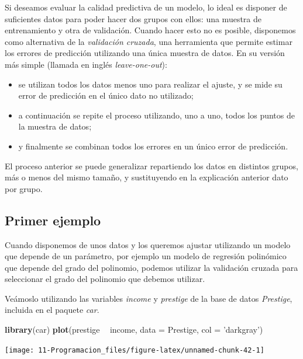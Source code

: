 \documentclass[]{book}
\newenvironment{Shaded}{\begin{snugshade}}{\end{snugshade}}
\newcommand{\KeywordTok}[1]{\textcolor[rgb]{0.13,0.29,0.53}{\textbf{#1}}}
\newcommand{\DataTypeTok}[1]{\textcolor[rgb]{0.13,0.29,0.53}{#1}}
\newcommand{\StringTok}[1]{\textcolor[rgb]{0.31,0.60,0.02}{#1}}
\newcommand{\OperatorTok}[1]{\textcolor[rgb]{0.81,0.36,0.00}{\textbf{#1}}}
\newcommand{\NormalTok}[1]{#1}
\begin{document}
Si deseamos evaluar la calidad predictiva de un modelo, lo ideal es
disponer de suficientes datos para poder hacer dos grupos con ellos: una
muestra de entrenamiento y otra de validación. Cuando hacer esto no es
posible, disponemos como alternativa de la \emph{validación cruzada},
una herramienta que permite estimar los errores de predicción utilizando
una única muestra de datos. En su versión más simple (llamada en inglés
\emph{leave-one-out}):

\begin{itemize}
\item
  se utilizan todos los datos menos uno para realizar el ajuste, y se
  mide su error de predicción en el único dato no utilizado;
\item
  a continuación se repite el proceso utilizando, uno a uno, todos los
  puntos de la muestra de datos;
\item
  y finalmente se combinan todos los errores en un único error de
  predicción.
\end{itemize}

El proceso anterior se puede generalizar repartiendo los datos en
distintos grupos, más o menos del mismo tamaño, y sustituyendo en la
explicación anterior dato por grupo.

\subsection{Primer ejemplo}\label{primer-ejemplo}

Cuando disponemos de unos datos y los queremos ajustar utilizando un
modelo que depende de un parámetro, por ejemplo un modelo de regresión
polinómico que depende del grado del polinomio, podemos utilizar la
validación cruzada para seleccionar el grado del polinomio que debemos
utilizar.

Veámoslo utilizando las variables \emph{income} y \emph{prestige} de la
base de datos \emph{Prestige}, incluida en el paquete \emph{car}.

\begin{Shaded}
\begin{Highlighting}[]
\KeywordTok{library}\NormalTok{(car)}
\KeywordTok{plot}\NormalTok{(prestige }\OperatorTok{~}\StringTok{ }\NormalTok{income, }\DataTypeTok{data =}\NormalTok{ Prestige, }\DataTypeTok{col =} \StringTok{'darkgray'}\NormalTok{)}
\end{Highlighting}
\end{Shaded}

\begin{center}\texttt{[image: 11-Programacion\_files/figure-latex/unnamed-chunk-42-1]} \end{center}
\end{document}
